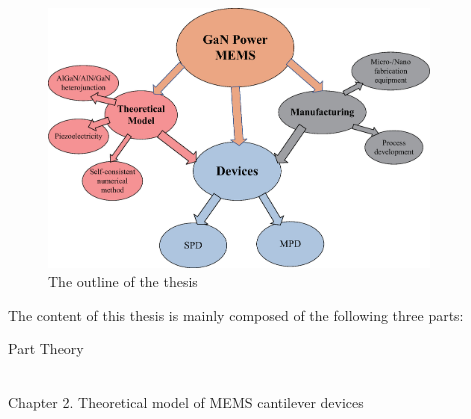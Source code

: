 \begin{figure}[H] 
\centering    
\includegraphics[width=0.9\textwidth]{Outline}
\caption[The outline of the thesis]{The outline of the thesis}
\label{fig:outline}
\end{figure}

\noindent The content of this thesis is mainly composed of the following three parts: \\

\begin{large}
\centerline{Part \uppercase\expandafter{} \quad Theory}
\end{large}

~\\

\noindent Chapter 2. Theoretical model of MEMS cantilever devices\\

